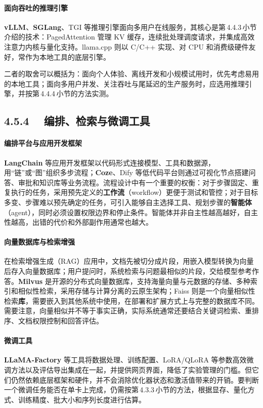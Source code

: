 \documentclass{article}
\begin{document}
\paragraph{面向吞吐的推理引擎} \textbf{vLLM}、\textbf{SGLang}、TGI 等推理引擎面向多用户在线服务，其核心是第\,4.4.3\,小节介绍的技术：PagedAttention 管理 KV 缓存，连续批处理调度请求，并集成高效注意力内核与量化支持\cite{kwon2023vllm}。llama.cpp 则以 C/C++ 实现、对 CPU 和消费级硬件友好，常作为本地工具的底层引擎。

二者的取舍可以概括为：面向个人体验、离线开发和小规模试用时，优先考虑易用的本地工具；面向多用户并发、关注吞吐与尾延迟的生产服务时，应选用推理引擎，并按第\,4.4.4\,小节的方法实测。

\subsection*{4.5.4　 编排、检索与微调工具}

\paragraph{编排平台与应用开发框架} \textbf{LangChain} 等应用开发框架以代码形式连接模型、工具和数据源，用“链”或“图”组织多步流程；\textbf{Coze}、Dify 等低代码平台则通过可视化节点搭建问答、审批和知识库等业务流程。流程设计中有一个重要的权衡\cite{anthropic2024agents}：对于步骤固定、重复执行的任务，采用预先定义的\textbf{工作流}（{workflow}）更便于测试和管控；对于目标多变、步骤难以预先确定的任务，可引入能够自主选择工具、规划步骤的\textbf{智能体}（{agent}），同时必须设置权限边界和停止条件。智能体并非自主性越高越好，自主性越高，出错的代价和外部副作用通常也越大。

\paragraph{向量数据库与检索增强} 在检索增强生成（RAG）应用中，文档先被切分成片段，用嵌入模型转换为向量后存入向量数据库；用户提问时，系统检索与问题最相似的片段，交给模型参考作答。\textbf{Milvus} 是开源的分布式向量数据库，支持海量向量与元数据的存储、多种索引和相似性检索，采用存储与计算分离的云原生架构\cite{milvus2024}；Faiss 则是一个向量相似性检索\textbf{库}，需要嵌入到其他系统中使用，在部署和扩展方式上与完整的数据库不同。需要注意，向量相似并不等于事实正确，实际系统通常还要结合关键词检索、重排序、文档权限控制和回答评估。

\paragraph{微调工具} \textbf{LLaMA-Factory} 等工具将数据处理、训练配置、LoRA/QLoRA 等参数高效微调方法\cite{hu2021lora,dettmers2023qlora}以及评估导出集成在一起，并提供网页界面，降低了实验管理的门槛。但它们仍然依赖底层框架和硬件，并不会消除优化器状态和激活值带来的开销。要判断一个微调任务能否在单卡上完成，仍需按第\,4.3.3\,小节的方法，根据显存、量化方式、训练精度、批大小和序列长度进行估算。
\end{document}
